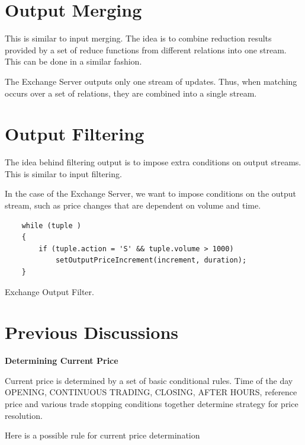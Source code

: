 \documentclass{article}
\begin{document}
\section{Output Merging}

This is similar to input merging. The idea is to combine reduction results provided by a set of reduce functions from different relations into one stream. This can be done in a similar fashion. 

The Exchange Server outputs only one stream of updates. Thus, when matching occurs over a set of relations, they are combined into a single stream. 


\section{Output Filtering} 

The idea behind filtering output is to impose extra conditions on output streams. This is similar to input filtering. 

In the case of the Exchange Server, we want to impose conditions on the output stream, such as price changes that are dependent on volume and time. 
\begin{program}
    \begin{verbatim}  
    while (tuple )
    {
        if (tuple.action = 'S' && tuple.volume > 1000)
            setOutputPriceIncrement(increment, duration);
    }
    \end{verbatim}
\caption{Exchange Output Filter.}
\end{program}

\section{Previous Discussions}

{\bf Determining Current Price} 

Current price is determined by a set of basic conditional rules. Time of the day OPENING, CONTINUOUS TRADING, CLOSING, AFTER HOURS, reference price and various trade stopping conditions together determine strategy for price resolution.

Here is a possible rule for current price determination
\end{document}
